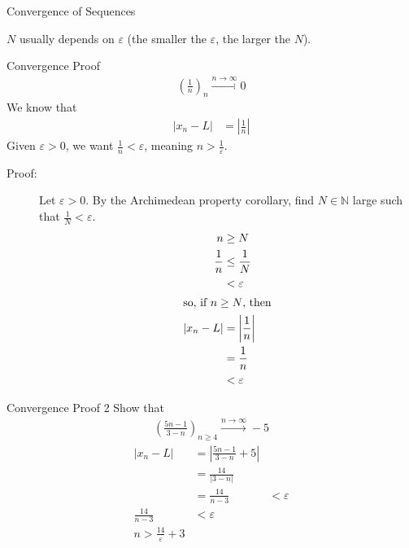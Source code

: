 \documentclass[8pt]{extarticle}
\newcommand{\N}{\mathbb{N}}
\begin{document}
\begin{problem}{Convergence of Sequences}
    \begin{description}
      \small
      \item[Note:] $N$ usually depends on $\varepsilon$ (the smaller the $\varepsilon$, the larger the $N$).
    \end{description}
    \begin{problem}{Convergence Proof}
      \begin{align*}
        \left(\frac{1}{n}\right)_{n} \xrightarrow{n\rightarrow\infty} 0
      \end{align*}
      \tcblower
      We know that
      \begin{align*}
        |x_n - L| &= \left|\frac{1}{n}\right|
      \end{align*}
      Given $\varepsilon > 0$, we want $\frac{1}{n} < \varepsilon$, meaning $n > \frac{1}{\varepsilon}$.
      \begin{description}
        \item[Proof:] Let $\varepsilon > 0$. By the Archimedean property corollary, find $N\in\N$ large such that $\frac{1}{N} < \varepsilon$.
          \begin{align*}
            n &\geq N\\
            \frac{1}{n} &\leq \frac{1}{N}\\
                        &< \varepsilon\\
            \shortintertext{so, if $n\geq N$, then}
            |x_n - L| &= \left|\frac{1}{n}\right|\\
                      &= \frac{1}{n}\\
                      &< \varepsilon
          \end{align*}
      \end{description}
    \end{problem}
    \begin{problem}{Convergence Proof 2}
      Show that
      \begin{align*}
        \left(\frac{5n-1}{3-n}\right)_{n\geq 4} \xrightarrow{n\rightarrow\infty} -5
      \end{align*}
      \tcblower
      \begin{align*}
        |x_n - L| &= \left|\frac{5n-1}{3-n} + 5\right|\\
                  &= \frac{14}{|3-n|}\\
                  &= \frac{14}{n-3}
                  &< \varepsilon\\
        \frac{14}{n-3} &< \varepsilon\\
        n > \frac{14}{\varepsilon} + 3

\end{align*}
\end{problem}
\end{problem}
\end{document}
